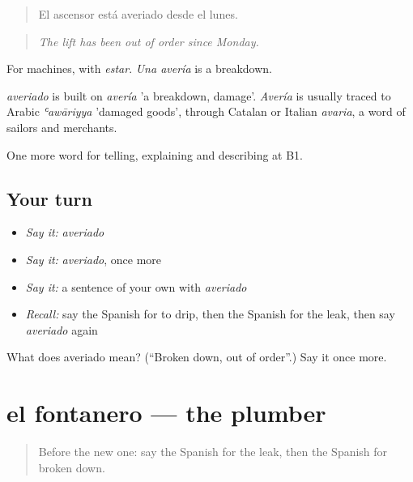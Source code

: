 \begin{quote}
El ascensor está averiado desde el lunes.
\end{quote}

\begin{quote}
\emph{The lift has been out of order since Monday.}
\end{quote}

For machines, with \emph{estar}. \emph{Una avería} is a breakdown.

\begin{cousinweb}
\emph{averiado} is built on \emph{avería} 'a breakdown, damage'. \emph{Avería} is usually traced to Arabic \emph{ʿawāriyya} 'damaged goods', through Catalan or Italian \emph{avaria}, a word of sailors and merchants.
\end{cousinweb}

\begin{grammarlens}[title={What you've built}]
One more word for telling, explaining and describing at B1.
\end{grammarlens}

\subsection*{Your turn}
\begin{itemize}
\raggedright
  \item \emph{Say it:} \emph{averiado}
  \item \emph{Say it:} \emph{averiado}, once more
  \item \emph{Say it:} a sentence of your own with \emph{averiado}
  \item \emph{Recall:} say the Spanish for to drip, then the Spanish for the leak, then say \emph{averiado} again
\end{itemize}

\begin{tcolorbox}[breakable,colback=teal!4,colframe=teal!35!black,title={Before you move on}]
What does averiado mean? (\textquotedblleft{}Broken down, out of order\textquotedblright{}.) Say it once more.
\end{tcolorbox}
\section[el fontanero]{el fontanero — the plumber}

\label{lesson:ES-C769-fontanero}



\begin{quote}
Before the new one: say the Spanish for the leak, then the Spanish for broken down.
\end{quote}

